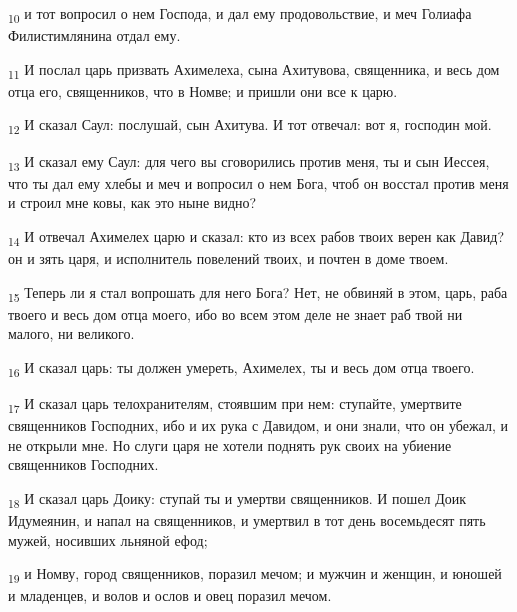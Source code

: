 \begin{tcolorbox}
\textsubscript{10} и тот вопросил о нем Господа, и дал ему продовольствие, и меч Голиафа Филистимлянина отдал ему.
\end{tcolorbox}
\begin{tcolorbox}
\textsubscript{11} И послал царь призвать Ахимелеха, сына Ахитувова, священника, и весь дом отца его, священников, что в Номве; и пришли они все к царю.
\end{tcolorbox}
\begin{tcolorbox}
\textsubscript{12} И сказал Саул: послушай, сын Ахитува. И тот отвечал: вот я, господин мой.
\end{tcolorbox}
\begin{tcolorbox}
\textsubscript{13} И сказал ему Саул: для чего вы сговорились против меня, ты и сын Иессея, что ты дал ему хлебы и меч и вопросил о нем Бога, чтоб он восстал против меня и строил мне ковы, как это ныне видно?
\end{tcolorbox}
\begin{tcolorbox}
\textsubscript{14} И отвечал Ахимелех царю и сказал: кто из всех рабов твоих верен как Давид? он и зять царя, и исполнитель повелений твоих, и почтен в доме твоем.
\end{tcolorbox}
\begin{tcolorbox}
\textsubscript{15} Теперь ли я стал вопрошать для него Бога? Нет, не обвиняй в этом, царь, раба твоего и весь дом отца моего, ибо во всем этом деле не знает раб твой ни малого, ни великого.
\end{tcolorbox}
\begin{tcolorbox}
\textsubscript{16} И сказал царь: ты должен умереть, Ахимелех, ты и весь дом отца твоего.
\end{tcolorbox}
\begin{tcolorbox}
\textsubscript{17} И сказал царь телохранителям, стоявшим при нем: ступайте, умертвите священников Господних, ибо и их рука с Давидом, и они знали, что он убежал, и не открыли мне. Но слуги царя не хотели поднять рук своих на убиение священников Господних.
\end{tcolorbox}
\begin{tcolorbox}
\textsubscript{18} И сказал царь Доику: ступай ты и умертви священников. И пошел Доик Идумеянин, и напал на священников, и умертвил в тот день восемьдесят пять мужей, носивших льняной ефод;
\end{tcolorbox}
\begin{tcolorbox}
\textsubscript{19} и Номву, город священников, поразил мечом; и мужчин и женщин, и юношей и младенцев, и волов и ослов и овец поразил мечом.
\end{tcolorbox}
